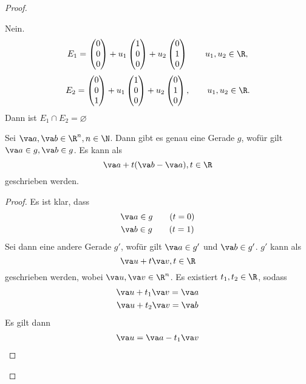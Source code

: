 \begin{proof}
\begin{parts}
		\item Nein.
		\[
		E_1=\begin{pmatrix} 0 \\ 0 \\ 0 \end{pmatrix} +u_1 \begin{pmatrix} 1 \\ 0 \\ 0 \end{pmatrix} +u_2 \begin{pmatrix} 0 \\ 1 \\ 0 \end{pmatrix} \qquad u_1,u_2\in \R
		,\] 
		\[
		E_2=\begin{pmatrix} 0 \\ 0 \\ 1 \end{pmatrix} +u_1\begin{pmatrix} 1 \\ 0 \\ 0 \end{pmatrix}+u_2\begin{pmatrix} 0 \\ 1 \\ 0 \end{pmatrix}, \qquad u_1,u_2\in \R
		.\]
		Dann ist $E_1\cap E_2=\varnothing$
	\item 
		\begin{Theorem}
			Sei $\va a, \va b\in \R^n, n\in \N$. Dann gibt es genau eine Gerade $g$, wof\"{u}r gilt $\va a \in g, \va b \in g$. Es kann als
			\[
			\va a+t(\va b-\va a), t\in \R
			\] 
			geschrieben werden.
		\end{Theorem}
		\begin{proof}
			Es ist klar, dass
			\begin{gather*}
				\va a\in g\qquad(t=0)\\
				\va b\in g\qquad(t=1)
			\end{gather*}
			Sei dann eine andere Gerade $g'$, wof\"{u}r gilt $\va a\in g'$ und $\va b\in g'$. $g'$ kann als
			\[
			\va u+t\va v, t\in \R
			\]
			geschrieben werden, wobei $\va u, \va v\in\R^n$. Es existiert $t_1,t_2\in\R$, sodass
			\begin{gather*}
				\va u+t_1\va v=\va a\\
				\va u+t_2\va v=\va b
			\end{gather*}
			Es gilt dann
			\begin{gather*}
				\va u=\va a-t_1\va v\\

\end{gather*}
\end{proof}
\end{parts}
\end{proof}
